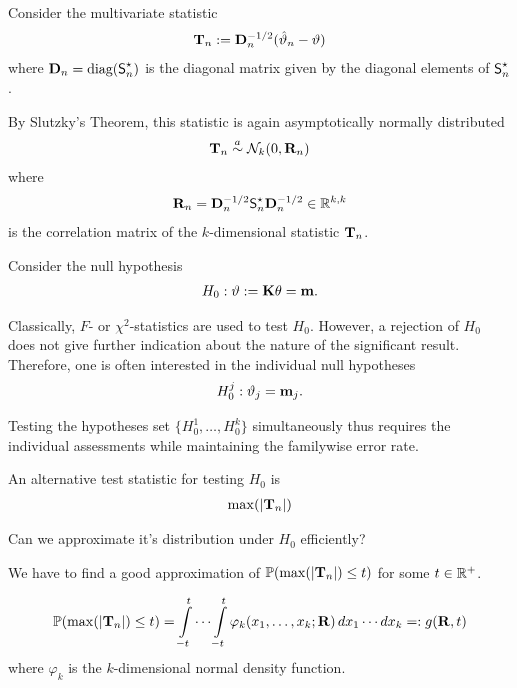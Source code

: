 \documentclass[landscape]{slides}
\begin{document}

Consider the multivariate statistic
\begin{eqnarray*}
\T_n := %
\D_n^{-1/2} (\hat{\vartheta}_n - \vartheta) 
\end{eqnarray*}
where $\mathbf{D}_n = \text{diag}(\textsf{S}^\star_n)$ is the diagonal matrix given by the diagonal elements of
$\textsf{S}^\star_n$.

By Slutzky's Theorem, this statistic is again asymptotically normally
distributed
\begin{eqnarray*}
\mathbf{T}_n \stackrel{a}{\sim} \mathcal{N}_k(0, \mathbf{R}_n)
\end{eqnarray*}
where
\begin{eqnarray*}
\mathbf{R}_n = \mathbf{D}_n^{-1/2} \textsf{S}^\star_n \mathbf{D}_n^{-1/2} \in \mathbb{R}^{k,k}
\end{eqnarray*}
is the correlation matrix of the $k$-dimensional statistic $\mathbf{T}_n$. 



Consider the null hypothesis
\begin{eqnarray*}
H_0: \vartheta := \mathbf{K} \theta = \mathbf{m}.
\end{eqnarray*}

Classically, $F$- or $\chi^2$-statistics are used to test $H_0$.
However, a rejection of $H_0$ 
does not give further indication about the nature of the significant
result. Therefore, one is often interested in the individual null hypotheses
\begin{eqnarray*}
H_0^j: \vartheta_j = \mathbf{m}_j.
\end{eqnarray*}

Testing the hypotheses set $\{H_0^1, \ldots, H_0^k\}$ simultaneously thus requires the individual
assessments while maintaining the familywise error rate.


An alternative test statistic for testing $H_0$ is
\begin{eqnarray*}
\max(|\mathbf{T}_n|)
\end{eqnarray*}

Can we approximate it's distribution under $H_0$ efficiently?

We have to find a good approximation of $\mathbb{P}(\max(|\mathbf{T}_n|) \le t)$
for some $t \in \mathbb{R}^+$.


\begin{eqnarray*}
\mathbb{P}(\max(|\mathbf{T}_n|) \le t) = \int\limits_{-t}^t \cdots \int\limits_{-t}^t
\varphi_k(x_1, \dots, x_k; \mathbf{R}) \, dx_1 \cdots dx_k =: g(\mathbf{R}, t) 
\end{eqnarray*}
where $\varphi_k$ is the $k$-dimensional normal density function.
\end{document}
